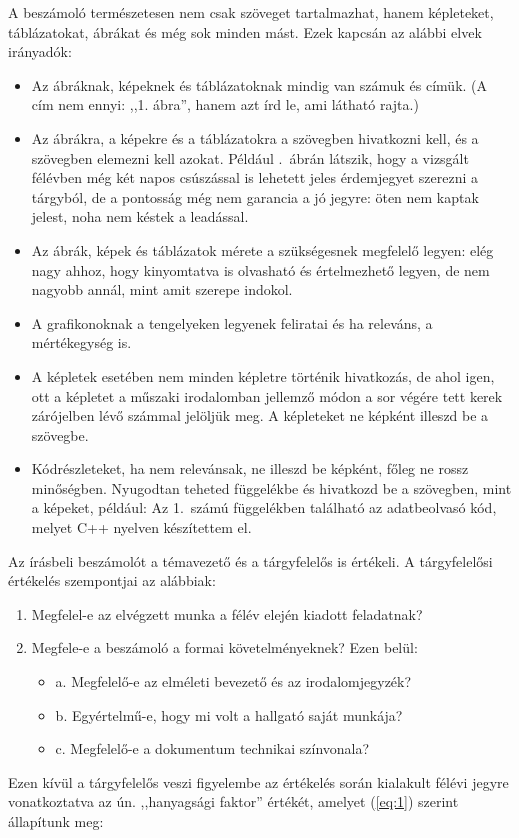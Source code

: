 \documentclass[a4paper,oneside]{article}
\begin{document}
A beszámoló természetesen nem csak szöveget tartalmazhat, hanem
képleteket, táblázatokat, ábrákat és még sok minden mást.  Ezek
kapcsán az alábbi elvek irányadók:
\begin{itemize}
\item Az ábráknak, képeknek és táblázatoknak mindig van számuk és
  címük. (A cím nem ennyi: ,,1. ábra'', hanem azt írd le, ami látható
  rajta.)

\item Az ábrákra, a képekre és a táblázatokra a szövegben hivatkozni
  kell, és a szövegben elemezni kell azokat. Például
  .~ábrán látszik, hogy a vizsgált félévben még két
  napos csúszással is lehetett jeles érdemjegyet szerezni a tárgyból,
  de a pontosság még nem garancia a jó jegyre: öten nem kaptak jelest,
  noha nem késtek a leadással.

\item Az ábrák, képek és táblázatok mérete a szükségesnek megfelelő
  legyen: elég nagy ahhoz, hogy kinyomtatva is olvasható és
  értelmezhető legyen, de nem nagyobb annál, mint amit szerepe
  indokol.

\item A grafikonoknak a tengelyeken legyenek feliratai és ha releváns,
  a mértékegység is.

\item A képletek esetében nem minden képletre történik hivatkozás, de
  ahol igen, ott a képletet a műszaki irodalomban jellemző módon a sor
  végére tett kerek zárójelben lévő számmal jelöljük meg.  A
  képleteket ne képként illeszd be a szövegbe.

\item Kódrészleteket, ha nem relevánsak, ne illeszd be képként, főleg
  ne rossz minőségben. Nyugodtan teheted függelékbe és hivatkozd be a
  szövegben, mint a képeket, például: Az 1.~számú függelékben
  található az adatbeolvasó kód, melyet C++ nyelven készítettem el.
\end{itemize}

Az írásbeli beszámolót a témavezető és a tárgyfelelős is értékeli. A
tárgyfelelősi értékelés szempontjai az alábbiak:
\begin{enumerate}
\item Megfelel-e az elvégzett munka a félév elején kiadott feladatnak?
\item Megfele-e a beszámoló a formai követelményeknek? Ezen belül:
  \begin{itemize}
  \item a. Megfelelő-e az elméleti bevezető és az irodalomjegyzék?
  \item b. Egyértelmű-e, hogy mi volt a hallgató saját munkája?
  \item c. Megfelelő-e a dokumentum technikai színvonala?
  \end{itemize}

\end{enumerate}
Ezen kívül a tárgyfelelős veszi figyelembe az értékelés során
kialakult félévi jegyre vonatkoztatva az ún. ,,hanyagsági faktor''
értékét, amelyet (\ref{eq:1}) szerint állapítunk meg:
\end{document}
